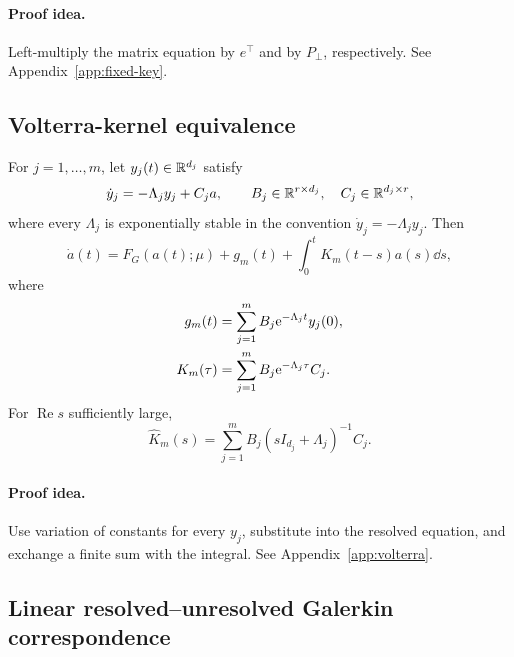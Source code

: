 \paragraph{Proof idea.}
Left-multiply the matrix equation by $e^\top$ and by $P_\perp$,
respectively. See Appendix~\ref{app:fixed-key}.

\subsection{Volterra-kernel equivalence}
\label{sec:volterra}

\label{thm:volterra}
\begin{theoremfour}
For $j=1,\ldots,m$, let $y_j(t)\in\mathbb{R}^{d_j}$ satisfy
\begin{equation}
 \dot y_j=-\Lambda_jy_j+C_ja,
 \qquad
 B_j\in\mathbb{R}^{r\times d_j},\quad
 C_j\in\mathbb{R}^{d_j\times r},
 \label{eq:auxiliary-system}
\end{equation}
where every $\Lambda_j$ is exponentially stable in the convention
$\dot y_j=-\Lambda_jy_j$. Then
\begin{equation}
 \dot a(t)=F_G(a(t);\mu)+g_m(t)
 +\int_0^tK_m(t-s)a(s)\dd s,
 \label{eq:volterra-resolved}
\end{equation}
where
\begin{align}
 g_m(t)&=\sum_{j=1}^{m}B_j\mathrm{e}^{-\Lambda_jt}y_j(0),
 \label{eq:initial-slip}\\
 K_m(\tau)&=\sum_{j=1}^{m}B_j\mathrm{e}^{-\Lambda_j\tau}C_j.
 \label{eq:finite-kernel}
\end{align}
For $\operatorname{Re}s$ sufficiently large,
\begin{equation}
 \widehat K_m(s)
 =\sum_{j=1}^{m}B_j(sI_{d_j}+\Lambda_j)^{-1}C_j.
 \label{eq:kernel-laplace}
\end{equation}
\end{theoremfour}

\paragraph{Proof idea.}
Use variation of constants for every $y_j$, substitute into the resolved
equation, and exchange a finite sum with the integral. See
Appendix~\ref{app:volterra}.

\subsection{Linear resolved--unresolved Galerkin correspondence}
\label{sec:linear-correspondence}

